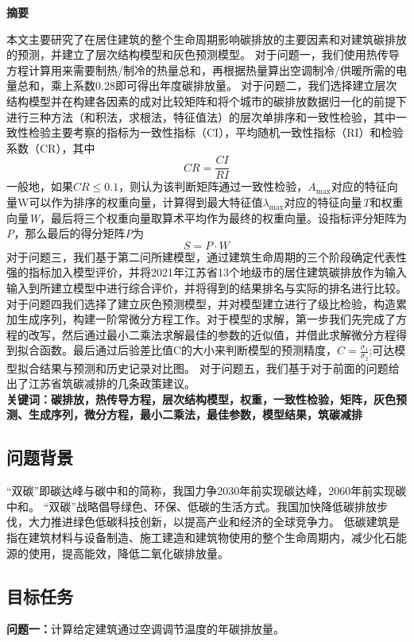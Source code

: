 \documentclass[a4paper, 12pt]{article}
\numberwithin{equation}{section}
\begin{document}
    \centerline{\textbf{\LARGE{摘要}}}
    本文主要研究了在居住建筑的整个生命周期影响碳排放的主要因素和对建筑碳排放的预测，并建立了层次结构模型和灰色预测模型。
    对于问题一，我们使用热传导方程计算用来需要制热/制冷的热量总和，再根据热量算出空调制冷/供暖所需的电量总和，乘上系数0.28即可得出年度碳排放量。
    对于问题二，我们选择建立层次结构模型并在构建各因素的成对比较矩阵和将个城市的碳排放数据归一化的前提下进行三种方法（和积法，求根法，特征值法）的层次单排序和一致性检验，其中一致性检验主要考察的指标为一致性指标（CI），平均随机一致性指标（RI）和检验系数（CR），其中
    \[ CR = \frac{CI}{RI} \]
    一般地，如果$ CR ≤ 0.1 $，则认为该判断矩阵通过一致性检验，$ A_{\max} $对应的特征向量W可以作为排序的权重向量，计算得到最大特征值$ \lambda _{\max} $对应的特征向量\textit{T}和权重向量\textit{W}，最后将三个权重向量取算术平均作为最终的权重向量。设指标评分矩阵为\textit{P}，那么最后的得分矩阵\textit{P}为
    \[ S = P \cdot W \]
    对于问题三，我们基于第二问所建模型，通过建筑生命周期的三个阶段确定代表性强的指标加入模型评价，并将2021年江苏省13个地级市的居住建筑碳排放作为输入输入到所建立模型中进行综合评价，并将得到的结果排名与实际的排名进行比较。
    对于问题四我们选择了建立灰色预测模型，并对模型建立进行了级比检验，构造累加生成序列，构建一阶常微分方程工作。对于模型的求解，第一步我们先完成了方程的改写，然后通过最小二乘法求解最佳的参数的近似值，并借此求解微分方程得到拟合函数。最后通过后验差比值C的大小来判断模型的预测精度，$ C = \frac{\sigma _{1}}{\sigma _{2}} $;可达模型拟合结果与预测和历史记录对比图。
    对于问题五，我们基于对于前面的问题给出了江苏省筑碳减排的几条政策建议。 \\
    \textbf{关键词：碳排放，热传导方程，层次结构模型，权重，一致性检验，矩阵，灰色预测、生成序列，微分方程，最小二乘法，最佳参数，模型结果，筑碳减排}

    {}
        \subsection{问题背景}
        “双碳”即碳达峰与碳中和的简称，我国力争2030年前实现碳达峰，2060年前实现碳中和。
        “双碳”战略倡导绿色、环保、低碳的生活方式。我国加快降低碳排放步伐，大力推进绿色低碳科技创新，以提高产业和经济的全球竞争力。
        低碳建筑是指在建筑材料与设备制造、施工建造和建筑物使用的整个生命周期内，减少化石能源的使用，提高能效，降低二氧化碳排放量。

        \subsection{目标任务}
            \textbf{问题一：}计算给定建筑通过空调调节温度的年碳排放量。
\end{document}
